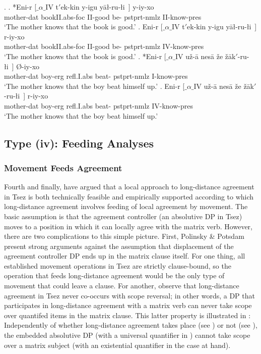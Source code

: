 \documentclass[output=paper
,modfonts
,nonflat]{langsci/langscibook}
\begin{document}
\Lsciexi. 
\ag. *Eni-r [$\_${$\alpha$}$\_${\rm IV} t$'$ek-kin y-igu y\={a}\l -ru-\l i~] y-iy-xo\\
mother-{\sc dat} {} bookII.{\sc abs}-{\sc foc} II-good be-{\sc
  pstprt-nmlz} II-know-{\sc pres}\\
`The mother knows that the {\sc book} \rm is good.'
\bg. Eni-r [$\_${$\alpha$}$\_${\rm IV} t$'$ek-kin y-igu y\={a}\l -ru-\l i~] r-iy-xo\\
mother-{\sc dat} {} bookII.{\sc abs}-{\sc foc} II-good be-{\sc
  pstprt-nmlz} IV-know-{\sc pres}\\
`The mother knows that the {\sc book} \rm is good.'
\bg. *Eni-r [$\_${$\alpha$}$\_${\rm IV} u\v{z}-\={a} {nes\={a} \v{z}e}
  \v{z}\={a}k$'$-ru-\l i~] {\O}-iy-xo \\
mother-{\sc dat} {} boy-{\sc erg} {\sc refl}.I.{\sc abs} beat-{\sc
  pstprt-nmlz} I-know-{\sc pres}\\
`The mother knows that the boy beat himself up.'
\bg. Eni-r [$\_${$\alpha$}$\_${\rm IV} u\v{z}-\={a} {nes\={a} \v{z}e}
  \v{z}\={a}k$'$-ru-\l i~] r-iy-xo \\
mother-{\sc dat} {} boy-{\sc erg} {\sc refl}.I.{\sc abs} beat-{\sc
  pstprt-nmlz} IV-know-{\sc pres}\\
`The mother knows that the boy beat himself up.'

\subsection{Type (iv): Feeding Analyses}

\subsubsection{Movement Feeds Agreement}

Fourth and finally, \cite{Polinsky&Potsdam:01} have argued that a
local approach to long-distance agreement in Tsez is both technically
feasible and empirically supported according to which long-distance
agreement involves feeding of local agreement by movement. The basic
assumption is that the agreement controller (an absolutive DP in Tsez)
moves to a position in which it can locally agree with the matrix
verb. However, there are two complications to this simple
picture. First, Polinsky \& Potsdam present strong arguments against
the assumption that displacement of the agreement controller DP ends
up in the matrix clause itself. For one thing, all established
movement operations in Tsez are strictly clause-bound, so the 
operation that feeds long-distance agreement would be the only type of
movement that could leave a clause. For another,
\cite{Polinsky&Potsdam:01} observe that long-distance
agreement in Tsez never co-occurs with scope reversal; in other words,
a DP that participates in long-distance agreement with a matrix verb
can never take scope over quantifed items in the matrix clause.
This latter property is illustrated in \Next: Independently of whether
long-distance agreement takes place (see \Next[b]) or not (see
\Next[a]), the embedded absolutive DP (with a universal quantifier in
\Next) cannot take scope over a  matrix subject (with an existential
quantifier in the case at hand). 
\end{document}
